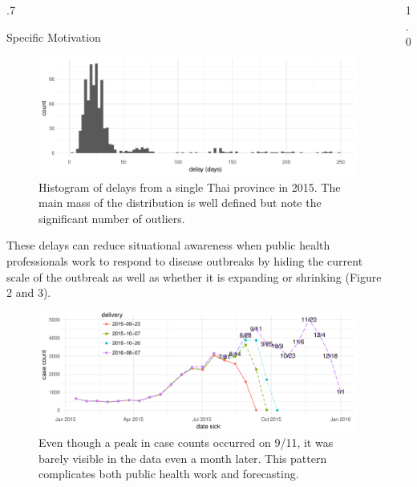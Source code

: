 \documentclass[final]{beamer}
\newlength{\onecolwid}
\begin{document}
\begin{frame}[t]
\begin{columns}[t]
\begin{column}{.7\onecolwid}
\begin{block}{Specific Motivation}
\begin{figure}
 \begin{center}
    \includegraphics[width=1 \textwidth]{delay-contamination}
 \end{center}
 \caption{\small Histogram of delays from a single Thai province in 2015.  The main mass of the distribution is well defined but note the significant number of outliers.}
\end{figure}

These delays can reduce situational awareness when public health professionals work to respond to disease outbreaks by hiding the current scale of the outbreak as well as whether it is expanding or shrinking (Figure 2 and 3).

\vspace{0.2in}

\begin{figure}
 \begin{center}
    \includegraphics[width=1 \textwidth]{reporting-is-relevant-short}
 \end{center}
 \caption{\small Even though a peak in case counts occurred on 9/11, it was barely visible in the data even a month later.  This pattern complicates both public health work and forecasting.}
\end{figure}

\end{block}


\end{column}

\begin{column}{1.0\onecolwid} 



\end{column}
\end{columns}
\end{frame}
\end{document}
